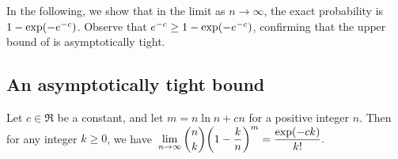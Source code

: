 In the following, we show that in the limit as $n \to \infty$, the exact probability is $1- \exp\pth{-e^{-c}}$.
Observe that $e^{-c} \geq 1- \exp\pth{-e^{-c}}$, confirming that the upper bound of  is asymptotically tight.


\subsection{An asymptotically tight bound}


\begin{lemma}
    Let $c \in \Re$ be a constant, and let $m = n \ln n +c n$ for a positive
    integer $n$. Then for any integer $k \geq 0$, we have
    \begin{math}%
        \ds\,%
        \lim_{n\rightarrow \infty} \binom{n}{k} \pth[]{ 1-
           \frac{k}{n}}^m = \frac{\exp(-ck)}{k!}.
    \end{math}
    
\end{lemma}
